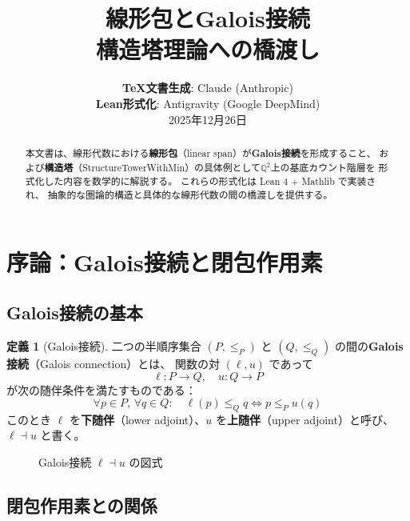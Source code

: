 \documentclass[a4paper,11pt]{ltjsarticle}
\title{%
  \textbf{線形包とGalois接続}\\[0.5em]
  \Large 構造塔理論への橋渡し
}
\author{%
  \textbf{TeX文書生成}: Claude (Anthropic)\\
  \textbf{Lean形式化}: Antigravity (Google DeepMind)\\[0.5em]
  \small 2025年12月26日
}
\date{}
\theoremstyle{definition}
\newtheorem{definition}{定義}[section]
\begin{document}
\maketitle

\begin{abstract}
本文書は、線形代数における\textbf{線形包}（linear span）が\textbf{Galois接続}を形成すること、
および\textbf{構造塔}（StructureTowerWithMin）の具体例として$\mathbb{Q}^2$上の基底カウント階層を
形式化した内容を数学的に解説する。
これらの形式化は Lean 4 + Mathlib で実装され、
抽象的な圏論的構造と具体的な線形代数の間の橋渡しを提供する。
\end{abstract}

\tableofcontents

\newpage

\section{序論：Galois接続と閉包作用素}

\subsection{Galois接続の基本}

\begin{definition}[Galois接続]
  二つの半順序集合 $(P, \leq_P)$ と $(Q, \leq_Q)$ の間の\textbf{Galois接続}（Galois connection）とは、
  関数の対 $(\ell, u)$ であって
  \[
    \ell : P \to Q, \quad u : Q \to P
  \]
  が次の随伴条件を満たすものである：
  \[
    \forall p \in P,\, \forall q \in Q:\quad \ell(p) \leq_Q q \iff p \leq_P u(q)
  \]
  このとき $\ell$ を\textbf{下随伴}（lower adjoint）、$u$ を\textbf{上随伴}（upper adjoint）と呼び、
  $\ell \dashv u$ と書く。
\end{definition}

\begin{figure}[htbp]
  \centering
  \caption{Galois接続 $\ell \dashv u$ の図式}
  \label{fig:galois-connection}
\end{figure}

\subsection{閉包作用素との関係}
\end{document}
